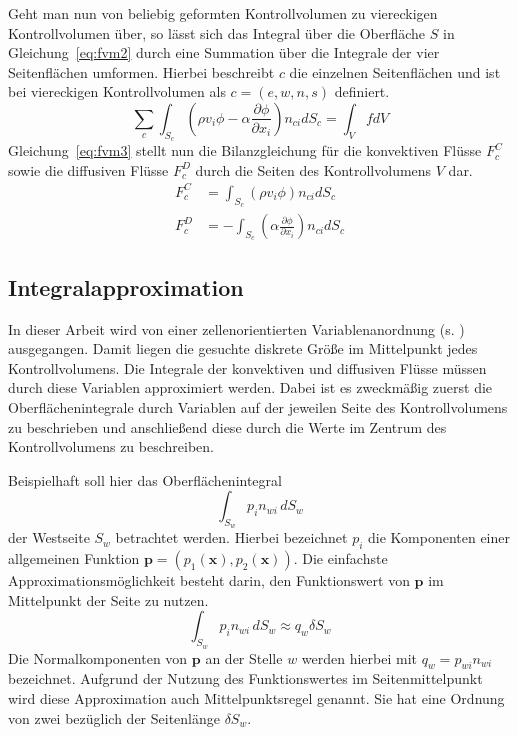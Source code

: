 Geht man nun von beliebig geformten Kontrollvolumen zu viereckigen Kontrollvolumen über,
so lässt sich das Integral über die Oberfläche $S$ in Gleichung~\eqref{eq:fvm2} durch eine
Summation über die Integrale der vier Seitenflächen umformen. Hierbei beschreibt $c$ die
einzelnen Seitenflächen und ist bei viereckigen Kontrollvolumen als $c=(e,w,n,s)$ definiert.
\begin{equation}
  \sum_c \int_{S_c} \left(\rho v_i \phi - \alpha \frac{\partial \phi}{\partial x_i}
\right) n_{ci} dS_c = \int_V f dV\label{eq:fvm3}
\end{equation}
Gleichung~\eqref{eq:fvm3} stellt nun die Bilanzgleichung für die konvektiven Flüsse
$F_c^C$ sowie die diffusiven Flüsse $F_c^D$ durch die Seiten des Kontrollvolumens $V$ dar.
\begin{align}
  F_c^C &=  \int_{S_c} \left(\rho v_i \phi \right) n_{ci} dS_c \\
  F_c^D &=  -\int_{S_c} \left(\alpha \frac{\partial \phi}{\partial x_i}\right) n_{ci} dS_c 
\end{align}

\subsection{Integralapproximation}

In dieser Arbeit wird von einer zellenorientierten Variablenanordnung (s. \cite{num_maschbau})
ausgegangen. Damit liegen die gesuchte diskrete Größe im Mittelpunkt jedes Kontrollvolumens.
Die Integrale der konvektiven und diffusiven Flüsse müssen durch diese Variablen
approximiert werden. Dabei ist es zweckmäßig zuerst die Oberflächenintegrale durch Variablen
auf der jeweilen Seite des Kontrollvolumens zu beschrieben und anschließend diese durch die Werte
im Zentrum des Kontrollvolumens zu beschreiben.

Beispielhaft soll hier das Oberflächenintegral
\begin{equation*}
  \int_{S_w} p_i n_{wi}\,dS_w
\end{equation*}
der Westseite $S_w$ betrachtet werden. Hierbei bezeichnet $p_i$ die Komponenten einer allgemeinen
Funktion $\mathbf{p} = (p_1(\mathbf{x}), p_2(\mathbf{x}))$. Die einfachste
Approximationsmöglichkeit besteht darin, den Funktionswert von $\mathbf{p}$ im Mittelpunkt
der Seite zu nutzen.
\begin{equation}
  \int_{S_w} p_i n_{wi}\,dS_w \approx q_w \delta S_w
\end{equation}
Die Normalkomponenten von $\mathbf{p}$ an der Stelle $w$ werden hierbei mit $q_w = p_{wi} n_{wi}$ bezeichnet.
Aufgrund der Nutzung des Funktionswertes im Seitenmittelpunkt wird diese Approximation auch Mittelpunktsregel genannt.
Sie hat eine Ordnung von zwei bezüglich der Seitenlänge $\delta S_w$.

